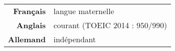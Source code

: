 
\begin{tabularx}{\textwidth}{@{}d X@{}}
  \textbf{Français} & langue maternelle\\
  \textbf{Anglais} & courant (\textcolor{english}{TOEIC 2014 : $950 / 990$})\\
  \textbf{Allemand} & indépendant\\
\end{tabularx}

%

